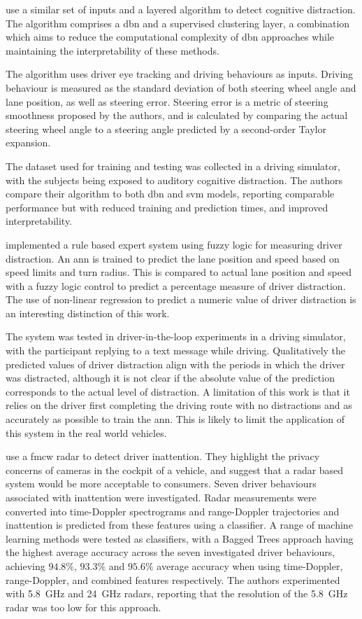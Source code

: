 \documentclass[11pt, parskip=half*,twoside=false]{scrbook}
\begin{document}
\citet{liangHybridBayesianNetwork2014} use a similar set of inputs and a layered algorithm to detect cognitive distraction. The algorithm comprises a \gls{dbn} and a supervised clustering layer, a combination which aims to reduce the computational complexity of \gls{dbn} approaches while maintaining the interpretability of these methods.

The algorithm uses driver eye tracking and driving behaviours as inputs. Driving behaviour is measured as the standard deviation of both steering wheel angle and lane position, as well as steering error. Steering error is a metric of steering smoothness proposed by the authors, and is calculated by comparing the actual steering wheel angle to a steering angle predicted by a second-order Taylor expansion. 

The dataset used for training and testing was collected in a driving simulator, with the subjects being exposed to auditory cognitive distraction. The authors compare their algorithm to both \gls{dbn} and \gls{svm} models, reporting comparable performance but with reduced training and prediction times, and improved interpretability.

\citet{aksjonovDetectionEvaluationDriver2019} implemented a rule based expert system using fuzzy logic for measuring driver distraction. An \gls{ann} is trained to predict the lane position and speed based on speed limits and turn radius. This is compared to actual lane position and speed with a fuzzy logic control to predict a percentage measure of driver distraction. The use of non-linear regression to predict a numeric value of driver distraction is an interesting distinction of this work.

The system was tested in driver-in-the-loop experiments in a driving simulator, with the participant replying to a text message while driving. Qualitatively the predicted values of driver distraction align with the periods in which the driver was distracted, although it is not clear if the absolute value of the prediction corresponds to the actual level of distraction. A limitation of this work is that it relies on the driver first completing the driving route with no distractions and as accurately as possible to train the \gls{ann}. This is likely to limit the application of this system in the real world vehicles.

 \citet{dingInattentiveDrivingBehavior2019} use a \gls{fmcw} radar to detect driver inattention. They highlight the privacy concerns of cameras in the cockpit of a vehicle, and suggest that a radar based system would be more acceptable to consumers. Seven driver behaviours associated with inattention were investigated. Radar measurements were converted into time-Doppler spectrograms and range-Doppler trajectories and inattention is predicted from these features using a classifier. A range of machine learning methods were tested as classifiers, with a Bagged Trees approach having the highest average accuracy across the seven investigated driver behaviours, achieving $94.8\%$, $93.3\%$ and $95.6\%$ average accuracy when using time-Doppler, range-Doppler, and combined features respectively. The authors experimented with 5.8~GHz and 24~GHz radars, reporting that the resolution of the 5.8~GHz radar was too low for this approach.
\end{document}

